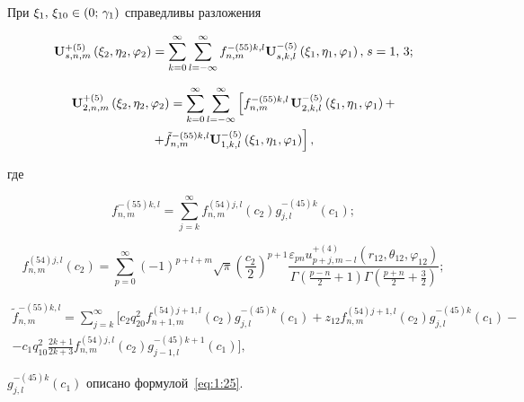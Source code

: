 \begin{theorem}
При ${\xi _1},{\mkern 1mu} {\kern 1pt} {\xi _{10}} \in (0;{\mkern 1mu} {\kern 1pt} {\gamma _1})$ справедливы разложения

\begin{equation}\label{eq:1:52}
{\bf{U}}_{s,n,m}^{ + (5)}\left( {{\xi _2},{\eta _2},{\varphi _2}} \right) = \sum\limits_{k = 0}^\infty  {\sum\limits_{l =  - \infty }^\infty  {f_{n,m}^{ - (55)k,l}} } {\bf{U}}_{s,k,l}^{ - (5)}\left( {{\xi _1},{\eta _1},{\varphi _1}} \right), {\kern 1pt} s = 1,{\mkern 1mu} {\kern 1pt} 3;
\end{equation}

\begin{multline}\label{eq:1:53}
{\bf{U}}_{2,n,m}^{ + (5)}\left( {{\xi _2},{\eta _2},{\varphi _2}} \right) = \sum\limits_{k = 0}^\infty  {\sum\limits_{l =  - \infty }^\infty  {\left[ {f_{n,m}^{ - (55)k,l}} \right.} } {\bf{U}}_{2,k,l}^{ - (5)}\left( {{\xi _1},{\eta _1},{\varphi _1}} \right) + \\
\left. { + \tilde f_{n,m}^{ - (55)k,l}{\bf{U}}_{1,k,l}^{ - (5)}\left( {{\xi _1},{\eta _1},{\varphi _1}} \right)} \right],
\end{multline}

\noindent где

\begin{equation}\label{eq:1:54}
f_{n,m}^{ - (55)k,l} = \sum\limits_{j = k}^\infty  {f_{n,m}^{(54)j,l}({c_2})g_{j,l}^{ - (45)k}} ({c_1});
\end{equation}

\begin{equation}\label{eq:1:55}
f_{n,m}^{(54)j,l}({c_2}) = \sum\limits_{p = 0}^\infty  {{{( - 1)}^{p + l + m}}} \sqrt \pi  {\left( {\frac{{{c_2}}}{2}} \right)^{p + 1}}\frac{{{\varepsilon _{pn}}u_{p + j,m - l}^{ + (4)}\left( {{r_{12}},{\theta _{12}},{\varphi _{12}}} \right)}}{{\Gamma \left( {\frac{{p - n}}{2} + 1} \right)\Gamma \left( {\frac{{p + n}}{2} + \frac{3}{2}} \right)}};
\end{equation}

\begin{multline}\label{eq:1:56}
\tilde f_{n,m}^{ - (55)k,l} = \sum\limits_{j = k}^\infty  \bigg[ {c_2}q_{20}^2f_{n + 1,m}^{(54)j + 1,l}({c_2})g_{j,l}^{ - (45)k}({c_1}) + {z_{12}}f_{n,m}^{(54)j + 1,l}({c_2})g_{j,l}^{ - (45)k}({c_1}) - \\
- {c_1}q_{10}^2\frac{{2k + 1}}{{2k + 3}}f_{n,m}^{(54)j,l}({c_2})g_{j - 1,l}^{ - (45)k + 1}({c_1}) \bigg],
\end{multline}

\noindent $g_{j,l}^{ - (45)k}({c_1})$ описано формулой~\eqref{eq:1:25}.
\end{theorem}
